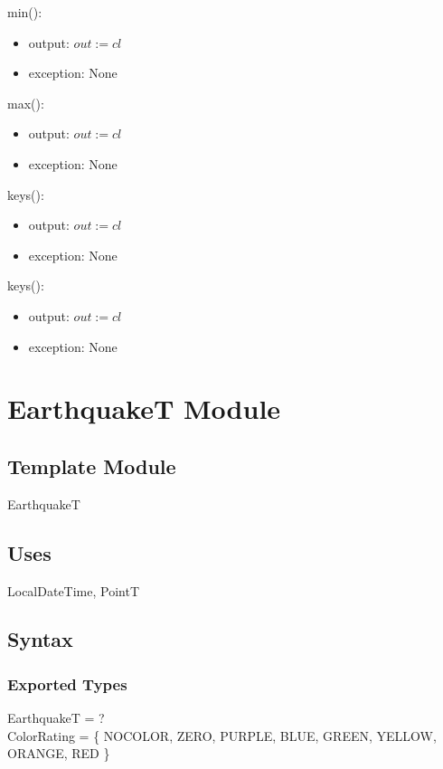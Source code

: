 \documentclass[12pt]{article}
\begin{document}
\noindent min():
\begin{itemize}
\item output: $out := cl$
\item exception: None
\end{itemize}

\noindent max():
\begin{itemize}
\item output: $out := cl$
\item exception: None
\end{itemize}

\noindent keys():
\begin{itemize}
\item output: $out := cl$
\item exception: None
\end{itemize}

\noindent keys():
\begin{itemize}
\item output: $out := cl$
\item exception: None
\end{itemize}

\newpage

\section* {EarthquakeT Module}

\subsection* {Template Module}

EarthquakeT

\subsection* {Uses}

LocalDateTime, PointT

\subsection* {Syntax}

\subsubsection* {Exported Types}

EarthquakeT = ?\\

\noindent ColorRating = \{ NOCOLOR, ZERO, PURPLE, BLUE, GREEN, YELLOW, ORANGE, RED \}\\
\end{document}
